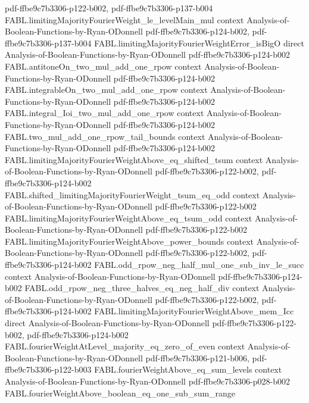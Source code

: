 \begin{theorem}
  {pdf-ffbe9c7b3306-p122-b002,
    pdf-ffbe9c7b3306-p137-b004}
\proofstep
  {FABL.limitingMajorityFourierWeight_le_levelMain_mul}
  {context}
  {Analysis-of-Boolean-Functions-by-Ryan-ODonnell}
  {pdf-ffbe9c7b3306-p124-b002,
    pdf-ffbe9c7b3306-p137-b004}
\proofstep
  {FABL.limitingMajorityFourierWeightError_isBigO}
  {direct}
  {Analysis-of-Boolean-Functions-by-Ryan-ODonnell}
  {pdf-ffbe9c7b3306-p124-b002}
\proofstep
  {FABL.antitoneOn_two_mul_add_one_rpow}
  {context}
  {Analysis-of-Boolean-Functions-by-Ryan-ODonnell}
  {pdf-ffbe9c7b3306-p124-b002}
\proofstep
  {FABL.integrableOn_two_mul_add_one_rpow}
  {context}
  {Analysis-of-Boolean-Functions-by-Ryan-ODonnell}
  {pdf-ffbe9c7b3306-p124-b002}
\proofstep
  {FABL.integral_Ioi_two_mul_add_one_rpow}
  {context}
  {Analysis-of-Boolean-Functions-by-Ryan-ODonnell}
  {pdf-ffbe9c7b3306-p124-b002}
\proofstep
  {FABL.two_mul_add_one_rpow_tail_bounds}
  {context}
  {Analysis-of-Boolean-Functions-by-Ryan-ODonnell}
  {pdf-ffbe9c7b3306-p124-b002}
\proofstep
  {FABL.limitingMajorityFourierWeightAbove_eq_shifted_tsum}
  {context}
  {Analysis-of-Boolean-Functions-by-Ryan-ODonnell}
  {pdf-ffbe9c7b3306-p122-b002,
    pdf-ffbe9c7b3306-p124-b002}
\proofstep
  {FABL.shifted_limitingMajorityFourierWeight_tsum_eq_odd}
  {context}
  {Analysis-of-Boolean-Functions-by-Ryan-ODonnell}
  {pdf-ffbe9c7b3306-p122-b002}
\proofstep
  {FABL.limitingMajorityFourierWeightAbove_eq_tsum_odd}
  {context}
  {Analysis-of-Boolean-Functions-by-Ryan-ODonnell}
  {pdf-ffbe9c7b3306-p122-b002}
\proofstep
  {FABL.limitingMajorityFourierWeightAbove_power_bounds}
  {context}
  {Analysis-of-Boolean-Functions-by-Ryan-ODonnell}
  {pdf-ffbe9c7b3306-p122-b002,
    pdf-ffbe9c7b3306-p124-b002}
\proofstep
  {FABL.odd_rpow_neg_half_mul_one_sub_inv_le_succ}
  {context}
  {Analysis-of-Boolean-Functions-by-Ryan-ODonnell}
  {pdf-ffbe9c7b3306-p124-b002}
\proofstep
  {FABL.odd_rpow_neg_three_halves_eq_neg_half_div}
  {context}
  {Analysis-of-Boolean-Functions-by-Ryan-ODonnell}
  {pdf-ffbe9c7b3306-p122-b002,
    pdf-ffbe9c7b3306-p124-b002}
\proofstep
  {FABL.limitingMajorityFourierWeightAbove_mem_Icc}
  {direct}
  {Analysis-of-Boolean-Functions-by-Ryan-ODonnell}
  {pdf-ffbe9c7b3306-p122-b002,
    pdf-ffbe9c7b3306-p124-b002}
\proofstep
  {FABL.fourierWeightAtLevel_majority_eq_zero_of_even}
  {context}
  {Analysis-of-Boolean-Functions-by-Ryan-ODonnell}
  {pdf-ffbe9c7b3306-p121-b006,
    pdf-ffbe9c7b3306-p122-b003}
\proofstep
  {FABL.fourierWeightAbove_eq_sum_levels}
  {context}
  {Analysis-of-Boolean-Functions-by-Ryan-ODonnell}
  {pdf-ffbe9c7b3306-p028-b002}
\proofstep
  {FABL.fourierWeightAbove_boolean_eq_one_sub_sum_range}

\end{theorem}
